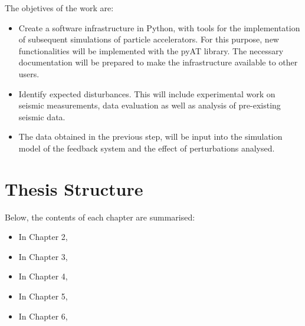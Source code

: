 The objetives of the work are:
\begin{itemize}
    \item Create a software infrastructure in Python, with tools for the implementation of subsequent simulations of particle accelerators. For this purpose, new functionalities will be implemented with the pyAT library. The necessary documentation will be prepared to make the infrastructure available to other users.      
    \item Identify expected disturbances. This will include experimental work on seismic measurements, data evaluation as well as analysis of pre-existing seismic data.
    \item The data obtained in the previous step, will be input into the simulation model of the feedback system and the effect of perturbations analysed.
\end{itemize}

\section{Thesis Structure}
Below, the contents of each chapter are summarised:

\begin{itemize}
    \item In Chapter 2, 
    \item In Chapter 3,
    \item In Chapter 4,
    \item In Chapter 5, 
    \item In Chapter 6,
\end{itemize}